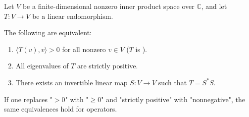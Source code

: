 \begin{proposition} \label{proposition:equivalent_conditions_for_positive_semidefinite_and_positive_definite_matrices}
    Let $V$ be a finite-dimensional nonzero inner product space over $\mathbb{C}$, and let $T: V \to V$ be a  linear endomorphism.

    The following are equivalent:
    \begin{enumerate}
        \item $\langle T(v), v \rangle > 0$ for all nonzero $v \in V$ ($T$ is ).
        \item All eigenvalues of $T$ are strictly positive.
        \item There exists an invertible linear map $S: V \to V$ such that $T = S^* S$.
    \end{enumerate}

    If one replaces "$> 0$" with "$\geq 0$" and "strictly positive" with "nonnegative", the same equivalences hold for  operators.
\end{proposition}
